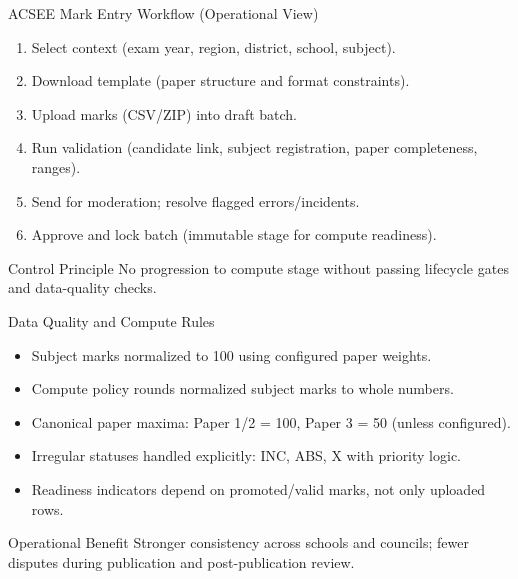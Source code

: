 \documentclass[aspectratio=169,11pt]{beamer}
\begin{document}
\begin{frame}{ACSEE Mark Entry Workflow (Operational View)}
\begin{enumerate}
  \item Select context (exam year, region, district, school, subject).
  \item Download template (paper structure and format constraints).
  \item Upload marks (CSV/ZIP) into draft batch.
  \item Run validation (candidate link, subject registration, paper completeness, ranges).
  \item Send for moderation; resolve flagged errors/incidents.
  \item Approve and lock batch (immutable stage for compute readiness).
\end{enumerate}

\vspace{0.25cm}
\begin{block}{Control Principle}
No progression to compute stage without passing lifecycle gates and data-quality checks.
\end{block}
\end{frame}

\begin{frame}{Data Quality and Compute Rules}
\begin{itemize}
  \item Subject marks normalized to 100 using configured paper weights.
  \item Compute policy rounds normalized subject marks to whole numbers.
  \item Canonical paper maxima: Paper 1/2 = 100, Paper 3 = 50 (unless configured).
  \item Irregular statuses handled explicitly: INC, ABS, X with priority logic.
  \item Readiness indicators depend on promoted/valid marks, not only uploaded rows.
\end{itemize}

\vspace{0.2cm}
\begin{alertblock}{Operational Benefit}
Stronger consistency across schools and councils; fewer disputes during publication and post-publication review.
\end{alertblock}
\end{frame}
\end{document}
